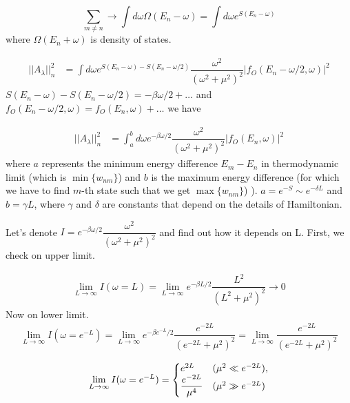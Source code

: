 \documentclass[11pt,a4paper]{article}
\begin{document}
\begin{equation}
\sum_{m \neq n}  \rightarrow \int d \omega \Omega(E_{n}- \omega)= \int d \omega e^{S(E_{n}- \omega)}
\end{equation}
where $\Omega(E_{n}+ \omega)$ is density of states.


\begin{align*}
||A_{\lambda}||^2_{n} &=\int d \omega e^{S(E_{n}- \omega)-S(E_n -\omega/2)} \dfrac{\omega^2}{(\omega^2 + \mu^2)^2}  |f_O(E_n - \omega/2, \omega)|^2 
\end{align*}
$S(E_{n}- \omega)-S(E_n -\omega/2) = -\beta \omega/2 + \ldots $ and $f_O(E_n - \omega/2, \omega)=f_O(E_n, \omega) + \ldots $ we have

\begin{align*}
||A_{\lambda}||^2_{n} &=\int_a^{b} d \omega e^{-\beta \omega/2} \dfrac{\omega^2}{(\omega^2 + \mu^2)^2}  |f_O(E_n, \omega)|^2 
\end{align*}
where $a$ represents the minimum energy difference $E_m-E_n$ in thermodynamic limit (which is $\min\{w_{nm}\}$) and $b$ is the maximum energy difference (for which we have to find $m$-th state such that we get $\max\{w_{nm}\}$) ). $a= e^{-S} \sim e^{-\delta L}$ and $b= \gamma L$, where $\gamma$ and $\delta$ are constants that depend on the details of Hamiltonian.

Let's denote $I=e^{-\beta \omega/2} \dfrac{\omega^2}{(\omega^2 + \mu^2)^2}$ and find out how it depends on L. First, we check on upper limit.

\begin{align*}
\lim_{L \rightarrow \infty}I(\omega=L)=\lim_{L \rightarrow \infty} e^{-\beta L/2} \dfrac{L^2}{(L^2 + \mu^2)^2} \rightarrow 0
\end{align*}
Now on lower limit.
\begin{align*}
\lim_{L \rightarrow \infty}I(\omega=e^{-L})=\lim_{L \rightarrow \infty} e^{-\beta e^{-L}/2} \dfrac{e^{-2L}}{(e^{-2L} + \mu^2)^2}=\lim_{L \rightarrow \infty} \dfrac{e^{-2L}}{(e^{-2L} + \mu^2)^2}
\end{align*}

\begin{equation}
  \lim_{L \rightarrow \infty}I(\omega=e^{-L})=\left\{
  \begin{array}{@{}ll@{}}
    e^{2L} & (\mu^2 \ll e^{-2L}), \\
     \dfrac{e^{-2L}}{ \mu^4} & (\mu^2 \gg e^{-2L})
  \end{array}\right.
\end{equation}
\end{document}
